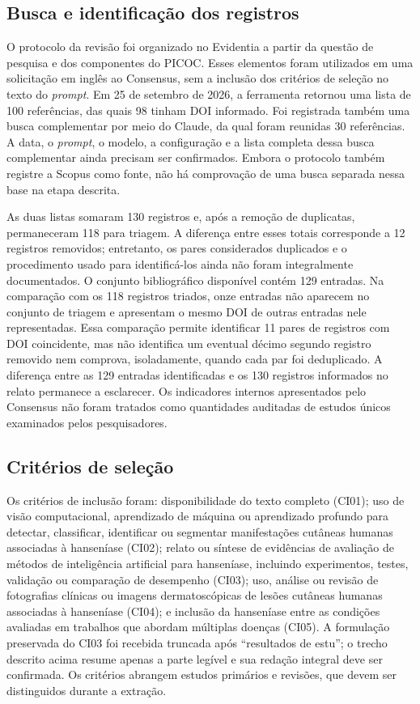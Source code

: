 \subsection{Busca e identificação dos registros}

O protocolo da revisão foi organizado no Evidentia a partir da questão de
pesquisa e dos componentes do PICOC. Esses elementos foram utilizados em
uma solicitação em inglês ao Consensus, sem a inclusão dos critérios de
seleção no texto do \textit{prompt}. Em 25 de setembro de 2026, a
ferramenta retornou uma lista de 100 referências, das quais 98 tinham DOI
informado. Foi registrada também uma busca complementar por meio do Claude, da qual
foram reunidas 30 referências. A data, o \textit{prompt}, o modelo, a configuração e a lista completa
dessa busca complementar ainda precisam ser confirmados. Embora o protocolo
também registre a Scopus como fonte, não há comprovação de uma busca separada
nessa base na etapa descrita.

As duas listas somaram 130 registros e,
após a remoção de duplicatas, permaneceram 118 para triagem. A diferença
entre esses totais corresponde a 12 registros removidos; entretanto, os
pares considerados duplicados e o procedimento usado para identificá-los
ainda não foram integralmente documentados. O conjunto bibliográfico disponível contém 129 entradas. Na comparação
com os 118 registros triados, onze entradas não aparecem no conjunto de triagem e apresentam o mesmo DOI de outras entradas nele
representadas. Essa comparação permite identificar 11 pares de
registros com DOI coincidente, mas não identifica um eventual décimo
segundo registro removido nem comprova, isoladamente, quando cada par
foi deduplicado. A diferença entre as 129 entradas identificadas e os
130 registros informados no relato permanece a esclarecer. Os
indicadores internos apresentados pelo Consensus não foram tratados
como quantidades auditadas de estudos únicos examinados pelos pesquisadores.

\subsection{Critérios de seleção}

Os critérios de inclusão foram: disponibilidade do texto completo (CI01);
uso de visão computacional, aprendizado de máquina ou aprendizado profundo
para detectar, classificar, identificar ou segmentar manifestações
cutâneas humanas associadas à hanseníase (CI02); relato ou síntese de
evidências de avaliação de métodos de inteligência artificial para
hanseníase, incluindo experimentos, testes, validação ou comparação de
desempenho (CI03); uso, análise ou revisão de fotografias clínicas ou
imagens dermatoscópicas de lesões cutâneas humanas associadas à hanseníase
(CI04); e inclusão da hanseníase entre as condições avaliadas em trabalhos
que abordam múltiplas doenças (CI05). A formulação preservada do CI03 foi
recebida truncada após ``resultados de estu''; o trecho descrito acima
resume apenas a parte legível e sua redação integral deve ser confirmada.
Os critérios abrangem estudos primários e revisões, que devem ser
distinguidos durante a extração.

